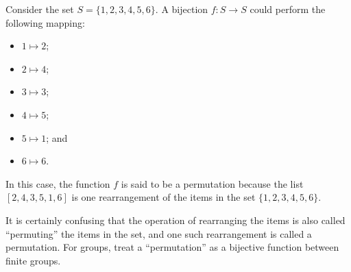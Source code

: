 \begin{example}
    Consider the set $S = \{1, 2, 3, 4, 5, 6\}$. A bijection $f: S \to S$ could perform the following mapping:
    \begin{multicols}{2}
        \begin{itemize}
            \item $1 \mapsto 2$;
            \item $2 \mapsto 4$;
            \item $3 \mapsto 3$;
            \item $4 \mapsto 5$;
            \item $5 \mapsto 1$; and
            \item $6 \mapsto 6$.
        \end{itemize}
    \end{multicols}
    In this case, the function $f$ is said to be a permutation because the list $[2, 4, 3, 5, 1, 6]$ is one rearrangement of the items in the set $\{1, 2, 3, 4, 5, 6\}$.
\end{example}

\begin{remark}
    It is certainly confusing that the operation of rearranging the items is also called ``permuting'' the items in the set, and one such rearrangement is called a permutation. For groups, treat a ``permutation'' as a bijective function between finite groups.
\end{remark}


